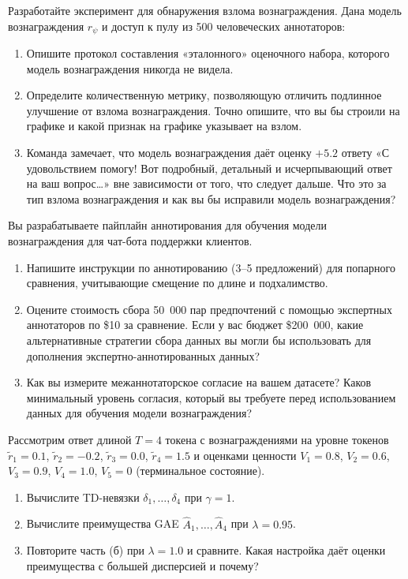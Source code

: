 \begin{exercise}
\label{ex:reward-hacking-detection}
Разработайте эксперимент для обнаружения взлома вознаграждения. Дана модель вознаграждения $r_\psi$ и доступ к пулу из 500 человеческих аннотаторов:
\begin{enumerate}
  \item Опишите протокол составления «эталонного» оценочного набора, которого модель вознаграждения никогда не видела.
  \item Определите количественную метрику, позволяющую отличить подлинное улучшение от взлома вознаграждения. Точно опишите, что вы бы строили на графике и какой признак на графике указывает на взлом.
  \item Команда замечает, что модель вознаграждения даёт оценку $+5.2$ ответу «С удовольствием помогу! Вот подробный, детальный и исчерпывающий ответ на ваш вопрос\ldots» вне зависимости от того, что следует дальше. Что это за тип взлома вознаграждения и как вы бы исправили модель вознаграждения?
\end{enumerate}
\end{exercise}

\begin{exercise}
\label{ex:annotation-design}
Вы разрабатываете пайплайн аннотирования для обучения модели вознаграждения для чат-бота поддержки клиентов.
\begin{enumerate}
  \item Напишите инструкции по аннотированию (3--5 предложений) для попарного сравнения, учитывающие смещение по длине и подхалимство.
  \item Оцените стоимость сбора 50~000 пар предпочтений с помощью экспертных аннотаторов по \$10 за сравнение. Если у вас бюджет \$200~000, какие альтернативные стратегии сбора данных вы могли бы использовать для дополнения экспертно-аннотированных данных?
  \item Как вы измерите межаннотаторское согласие на вашем датасете? Каков минимальный уровень согласия, который вы требуете перед использованием данных для обучения модели вознаграждения?
\end{enumerate}
\end{exercise}

\begin{exercise}
\label{ex:gae-computation}
Рассмотрим ответ длиной $T = 4$ токена с вознаграждениями на уровне токенов $\tilde{r}_1 = 0.1$, $\tilde{r}_2 = -0.2$, $\tilde{r}_3 = 0.0$, $\tilde{r}_4 = 1.5$ и оценками ценности $V_1 = 0.8$, $V_2 = 0.6$, $V_3 = 0.9$, $V_4 = 1.0$, $V_5 = 0$ (терминальное состояние).
\begin{enumerate}
  \item Вычислите TD-невязки $\delta_1, \ldots, \delta_4$ при $\gamma = 1$.
  \item Вычислите преимущества GAE $\hat{A}_1, \ldots, \hat{A}_4$ при $\lambda = 0.95$.
  \item Повторите часть (б) при $\lambda = 1.0$ и сравните. Какая настройка даёт оценки преимущества с большей дисперсией и почему?
\end{enumerate}
\end{exercise}

